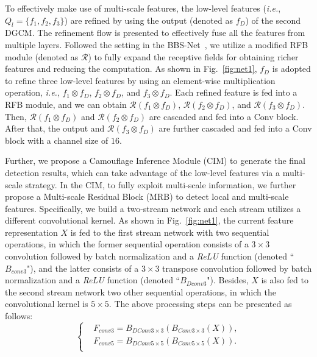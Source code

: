 \documentclass[lettersize,journal]{IEEEtran}
\def\ie{\emph{i.e.}}
\begin{document}
To effectively make use of multi-scale features, the low-level features (\ie, $Q_l = \{{f_1,f_2,f_3}\}$) are refined by using the output (denoted as $f_D$) of the second DGCM. The refinement flow is presented to effectively fuse all the features from multiple layers. Followed the setting in the BBS-Net~\cite{BBSNet}, we utilize a modified RFB module (denoted as $\mathcal{R}$) to fully expand the receptive fields for obtaining richer features and reducing the computation. As shown in Fig.~\ref{fig:net1}, $f_D$ is adopted to refine three low-level features by using an element-wise multiplication operation, \ie, $f_1\otimes{f_D}$, $f_2\otimes{f_D}$, and $f_3\otimes{f_D}$. Each refined feature is fed into a RFB module, and we can obtain $\mathcal{R}(f_1\otimes{f_D})$, $\mathcal{R}(f_2\otimes{f_D})$, and $\mathcal{R}(f_3\otimes{f_D})$. Then, $\mathcal{R}(f_1\otimes{f_D})$ and $\mathcal{R}(f_2\otimes{f_D})$ are cascaded and fed into a Conv block. After that, the output and $\mathcal{R}(f_3\otimes{f_D})$ are further cascaded and fed into a Conv block with a channel size of $16$.

Further, we propose a Camouflage Inference Module (CIM) to generate the final detection results, which can take advantage of the low-level features via a multi-scale strategy. In the CIM, to fully exploit multi-scale information, we further propose a Multi-scale Residual Block (MRB) to detect local and multi-scale features. Specifically, we build a two-stream network and each stream utilizes a different convolutional kernel. As shown in Fig.~\ref{fig:net1}, the current feature representation $X$ is fed to the first stream network with two sequential operations, in which the former sequential operation consists of a $3\times{3}$ convolution followed by batch normalization and a \emph{ReLU} function (denoted ``$B_{conv3}$"), and the latter consists of a $3\times{3}$ transpose convolution followed by batch normalization and a \emph{ReLU} function (denoted ``$B_{Dconv3}$"). Besides, $X$ is also fed to the second stream network two other sequential operations, in which the convolutional kernel is $5\times{5}$. The above processing steps can be presented as follows:
\begin{equation}
\left\{
\begin{aligned}
&F_{conv3}= B_{DConv{3\times{3}}}(B_{Conv3\times{3}}(X)),\\
&F_{conv5}= B_{DConv{5\times{5}}}(B_{Conv5\times{5}}(X)).\\
\end{aligned}
\right.
\label{eq01}
\end{equation}
\end{document}
